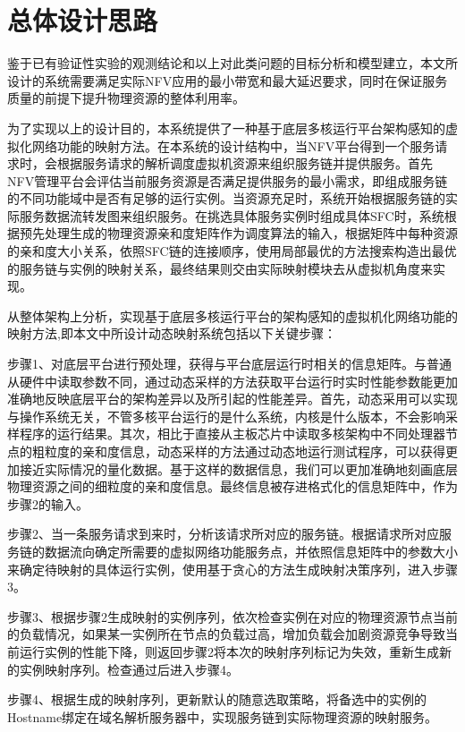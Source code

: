 \section{总体设计思路}
鉴于已有验证性实验的观测结论和以上对此类问题的目标分析和模型建立，本文所设计的系统需要满足实际NFV应用的最小带宽和最大延迟要求，同时在保证服务质量的前提下提升物理资源的整体利用率。

为了实现以上的设计目的，本系统提供了一种基于底层多核运行平台架构感知的虚拟化网络功能的映射方法。在本系统的设计结构中，当NFV平台得到一个服务请求时，会根据服务请求的解析调度虚拟机资源来组织服务链并提供服务。首先NFV管理平台会评估当前服务资源是否满足提供服务的最小需求，即组成服务链的不同功能域中是否有足够的运行实例。当资源充足时，系统开始根据服务链的实际服务数据流转发图来组织服务。在挑选具体服务实例时组成具体SFC时，系统根据预先处理生成的物理资源亲和度矩阵作为调度算法的输入，根据矩阵中每种资源的亲和度大小关系，依照SFC链的连接顺序，使用局部最优的方法搜索构造出最优的服务链与实例的映射关系，最终结果则交由实际映射模块去从虚拟机角度来实现。

从整体架构上分析，实现基于底层多核运行平台的架构感知的虚拟机化网络功能的映射方法,即本文中所设计动态映射系统包括以下关键步骤：

步骤1、对底层平台进行预处理，获得与平台底层运行时相关的信息矩阵。与普通从硬件中读取参数不同，通过动态采样的方法获取平台运行时实时性能参数能更加准确地反映底层平台的架构差异以及所引起的性能差异。首先，动态采用可以实现与操作系统无关，不管多核平台运行的是什么系统，内核是什么版本，不会影响采样程序的运行结果。其次，相比于直接从主板芯片中读取多核架构中不同处理器节点的粗粒度的亲和度信息，动态采样的方法通过动态地运行测试程序，可以获得更加接近实际情况的量化数据。基于这样的数据信息，我们可以更加准确地刻画底层物理资源之间的细粒度的亲和度信息。最终信息被存进格式化的信息矩阵中，作为步骤2的输入。 

步骤2、当一条服务请求到来时，分析该请求所对应的服务链。根据请求所对应服务链的数据流向确定所需要的虚拟网络功能服务点，并依照信息矩阵中的参数大小来确定待映射的具体运行实例，使用基于贪心的方法生成映射决策序列，进入步骤3。

步骤3、根据步骤2生成映射的实例序列，依次检查实例在对应的物理资源节点当前的负载情况，如果某一实例所在节点的负载过高，增加负载会加剧资源竞争导致当前运行实例的性能下降，则返回步骤2将本次的映射序列标记为失效，重新生成新的实例映射序列。检查通过后进入步骤4。

步骤4、根据生成的映射序列，更新默认的随意选取策略，将备选中的实例的Hostname绑定在域名解析服务器中，实现服务链到实际物理资源的映射服务。


